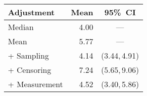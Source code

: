 \begin{tabular}{lrc}
  \toprule
  Adjustment    & Mean & 95\%~CI \\
  \midrule
  Median        & 4.00 & --- \\
  Mean          & 5.77 & --- \\
  + Sampling    & 4.14 & (3.44,\,4.91) \\
  + Censoring   & 7.24 & (5.65,\,9.06) \\
  + Measurement & 4.52 & (3.40,\,5.86) \\
  \bottomrule
\end{tabular}
